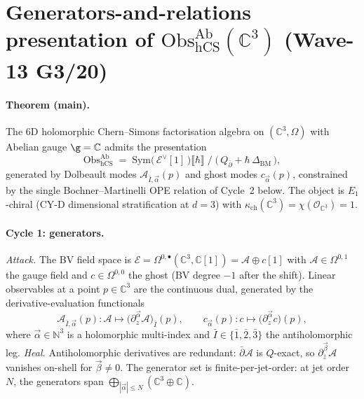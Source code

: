 
\providecommand{\C}{\mathbb{C}}
\providecommand{\R}{\mathbb{R}}
\providecommand{\Z}{\mathbb{Z}}
\providecommand{\N}{\mathbb{N}}
\providecommand{\hb}{\hbar}
\providecommand{\dbar}{\bar{\partial}}
\providecommand{\Obs}{\mathrm{Obs}}
\providecommand{\Sym}{\mathrm{Sym}}
\providecommand{\CE}{\mathrm{CE}}
\providecommand{\hCS}{\mathrm{hCS}}
\providecommand{\cE}{\mathcal{E}}
\providecommand{\cO}{\mathcal{O}}
\providecommand{\cA}{\mathcal{A}}
\providecommand{\Conf}{\mathrm{Conf}}
\providecommand{\BM}{\mathrm{BM}}
\providecommand{\kch}{\kappa_{\mathrm{ch}}}

\section*{Generators-and-relations presentation of $\Obs_{\hCS}^{\mathrm{Ab}}(\C^3)$
(Wave-13 G3/20)}

\paragraph{Theorem (main).}
The 6D holomorphic Chern--Simons factorisation algebra on $(\C^3, \Omega)$
with Abelian gauge $\g = \C$ admits the presentation
\[
  \Obs_{\hCS}^{\mathrm{Ab}}
  \;=\;
  \Sym\!\bigl(\, \cE^{\vee}[1] \,\bigr)\bigl\llbracket \hb \bigr\rrbracket
  \;\Big/\;
  \bigl(\, Q_{\dbar} + \hb\,\Delta_{\BM} \,\bigr),
\]
generated by Dolbeault modes $\cA_{\bar{I}, \vec{\alpha}}(p)$ and ghost
modes $c_{\vec{\alpha}}(p)$, constrained by the single Bochner--Martinelli
OPE relation of Cycle~2 below. The object is $E_1$-chiral (CY-D
dimensional stratification at $d = 3$) with $\kch(\C^3) = \chi(\cO_{\C^3}) = 1$.

\paragraph{Cycle 1: generators.}
\emph{Attack.} The BV field space is
$\cE = \Omega^{0,\bullet}(\C^3, \C[1]) = \cA \oplus c[1]$ with
$\cA \in \Omega^{0,1}$ the gauge field and $c \in \Omega^{0,0}$ the ghost
(BV degree $-1$ after the shift). Linear observables at a point
$p \in \C^3$ are the continuous dual, generated by the derivative-evaluation
functionals
\[
  \cA_{\bar{I}, \vec{\alpha}}(p)\!: \cA \mapsto
    \bigl(\partial_z^{\vec{\alpha}} \cA\bigr)_{\bar{I}}(p),
  \qquad
  c_{\vec{\alpha}}(p)\!: c \mapsto
    \bigl(\partial_z^{\vec{\alpha}} c\bigr)(p),
\]
where $\vec{\alpha} \in \N^3$ is a holomorphic multi-index and
$\bar{I} \in \{\bar{1}, \bar{2}, \bar{3}\}$ the antiholomorphic leg.
\emph{Heal.} Antiholomorphic derivatives are redundant: $\dbar \cA$ is
$Q$-exact, so $\partial_{\bar{z}}^{\vec{\beta}} \cA$ vanishes on-shell for
$\vec{\beta} \neq 0$. The generator set is finite-per-jet-order:
at jet order $N$, the generators span
$\bigoplus_{|\vec{\alpha}| \leq N}(\C^3 \oplus \C)$.

